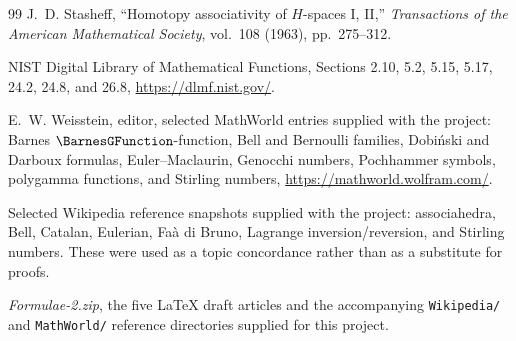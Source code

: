 \documentclass[11pt,a4paper,oneside,openany]{book}
\theoremstyle{definition}
\theoremstyle{remark}
\begin{document}
\begin{thebibliography}{99}
J.~D. Stasheff,
``Homotopy associativity of $H$-spaces I, II,''
\emph{Transactions of the American Mathematical Society}, vol.~108 (1963),
pp.~275--312.

NIST Digital Library of Mathematical Functions,
Sections 2.10, 5.2, 5.15, 5.17, 24.2, 24.8, and 26.8,
\url{https://dlmf.nist.gov/}.

E.~W. Weisstein, editor,
selected MathWorld entries supplied with the project: Barnes $\BarnesGFunction$-function, Bell
and Bernoulli families, Dobi\'nski and Darboux formulas, Euler--Maclaurin,
Genocchi numbers, Pochhammer symbols, polygamma functions, and Stirling numbers,
\url{https://mathworld.wolfram.com/}.

Selected Wikipedia reference snapshots supplied with the project: associahedra,
Bell, Catalan, Eulerian, Fa\`a di Bruno, Lagrange inversion/reversion, and Stirling
numbers.  These were used as a topic concordance rather than as a substitute for
proofs.

\emph{Formulae-2.zip}, the five LaTeX draft articles and the accompanying
\nolinkurl{Wikipedia/} and \nolinkurl{MathWorld/} reference directories supplied
for this project.

\end{thebibliography}

\printindex
\end{document}
